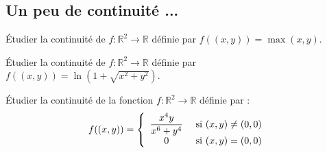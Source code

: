 \documentclass[a4paper,twoside,french,11pt]{VcCours}
\begin{document}

\tableofcontents
\separationTitre


\subsection{Un peu de continuité ...}



\begin{Exercice}{} Étudier la continuité de $f : \mathbb{R}^2 \rightarrow \mathbb{R}$ définie par $ f((x,y))=  \max(x,y)$.
\end{Exercice}


\begin{Exercice}{} Étudier la continuité de $f : \mathbb{R}^2 \rightarrow \mathbb{R}$ définie par $f((x,y))= \ln(1 + \sqrt{x^2+y^2})$.
\end{Exercice}


\begin{Exercice}{} Étudier la continuité de la fonction $f : \mathbb{R}^2 \rightarrow \mathbb{R}$ définie par :
$$ f((x,y)) = \left\lbrace \begin{array}{cl}
\dfrac{x^4 y}{x^6+y^4} & \hbox{ si } (x,y) \neq (0,0) \\
0 & \hbox{ si } (x,y)=(0,0) \\
\end{array}\right.$$
\end{Exercice}

%
\end{document}
